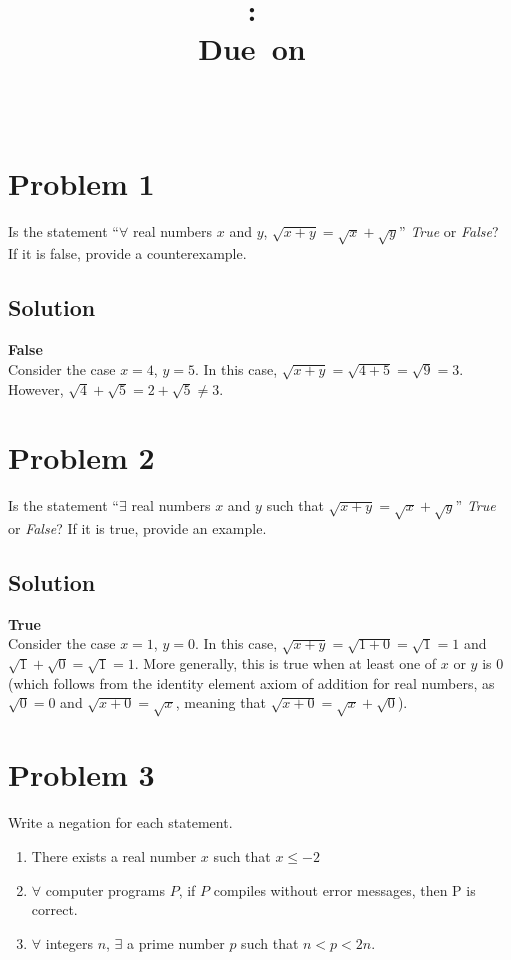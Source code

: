 \documentclass[table]{article}
\title{
    \vspace{2in}
    \textmd{\textbf{\hmwkClass:\ \hmwkTitle}}\\
    \normalsize\vspace{0.1in}\small{Due\ on\ \hmwkDueDate}\\
    \vspace{0.1in}\large{\textit{\hmwkClassInstructor\ \hmwkClassTime}}
    \vspace{3in}
}
\author{\hmwkAuthorName}
\date{}
\begin{document}
\maketitle

\pagebreak
\section{Problem 1}
Is the statement ``$\forall$ real numbers $x$ and $y$, $\sqrt{x + y} = \sqrt{x} + \sqrt{y}$'' \textit{True} or \textit{False}? If it is false, provide a counterexample.
\subsection{Solution}
\textbf{False}\\
Consider the case $x=4$, $y=5$. In this case, $\sqrt{x + y} = \sqrt{4 + 5} = \sqrt{9} = 3$. However, $\sqrt{4} + \sqrt{5} = 2 + \sqrt{5} \neq 3$.
\section{Problem 2}
Is the statement ``$\exists$ real numbers $x$ and $y$ such that $\sqrt{x + y} = \sqrt{x} + \sqrt{y}$'' \textit{True} or \textit{False}? If it is true, provide an example.
\subsection{Solution}
\textbf{True}\\
Consider the case $x=1$, $y=0$. In this case, $\sqrt{x + y} = \sqrt{1 + 0} = \sqrt{1} = 1$ and $\sqrt{1} + \sqrt{0} = \sqrt{1} = 1$. More generally, this is true when at least one of $x$ or $y$ is 0 (which follows from the identity element axiom of addition for real numbers, as $\sqrt{0} = 0$ and $\sqrt{x + 0} = \sqrt{x}$, meaning that $\sqrt{x + 0} = \sqrt{x} + \sqrt{0}$).
\section{Problem 3}
Write a negation for each statement.
\begin{enumerate}[nosep, label=\alph*)]
\item There exists a real number $x$ such that $x \leq -2$
\item $\forall$ computer programs $P$, if $P$ compiles without error messages, then P is correct.
\item $\forall$ integers $n$, $\exists$ a prime number $p$ such that $n < p < 2n$.
\end{enumerate}
\end{document}
